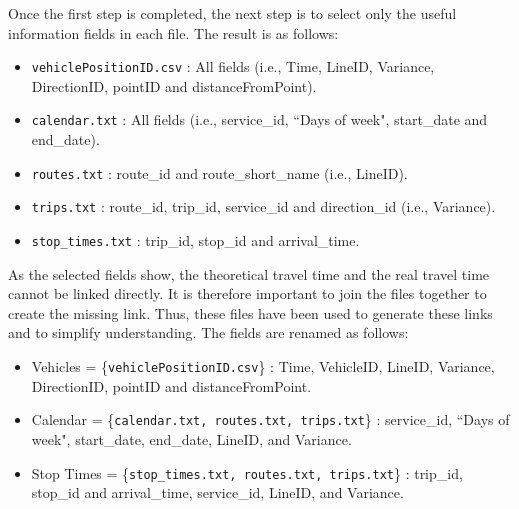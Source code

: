 \documentclass{article}
\begin{document}
Once the first step is completed, the next step is to select only the useful information fields in each file. The result is as follows:

\begin{itemize}
    \item \texttt{vehiclePositionID.csv} : All fields (i.e., Time, LineID, Variance, DirectionID, pointID and distanceFromPoint).
    \item \texttt{calendar.txt} : All fields (i.e., service\_id, ``Days of week", start\_date and end\_date).
    \item \texttt{routes.txt} : route\_id and route\_short\_name (i.e., LineID).
    \item \texttt{trips.txt} : route\_id, trip\_id, service\_id and direction\_id (i.e., Variance).
    \item \texttt{stop\_times.txt} : trip\_id, stop\_id and arrival\_time.
\end{itemize}

As the selected fields show, the theoretical travel time and the real travel time cannot be linked directly. It is therefore important to join the files together to create the missing link. Thus, these files have been used to generate these links and to simplify understanding. The fields are renamed as follows:
\begin{itemize}
    \item Vehicles = \{\texttt{vehiclePositionID.csv}\} : Time, VehicleID, LineID, Variance, DirectionID, pointID and distanceFromPoint.
    \item Calendar = \{\texttt{calendar.txt, routes.txt, trips.txt}\} : service\_id, ``Days of week", start\_date, end\_date, LineID, and Variance.
    \item Stop Times = \{\texttt{stop\_times.txt, routes.txt, trips.txt}\} : trip\_id, stop\_id and arrival\_time, service\_id, LineID, and Variance.
\end{itemize}
\end{document}
